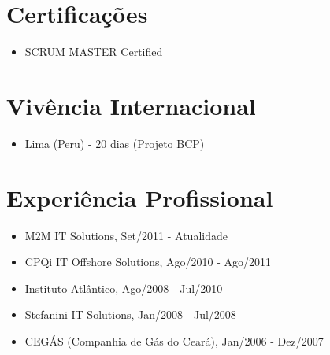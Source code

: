 \documentclass[letterpaper]{article}
\begin{document}
\section*{Certificações}
\begin{itemize}
  \item SCRUM MASTER Certified
\end{itemize}

\section*{Vivência Internacional}
\begin{itemize}
  \item Lima (Peru) - 20 dias (Projeto BCP)
\end{itemize}

\section*{Experiência Profissional}

\begin{itemize}
\item M2M IT Solutions, Set/2011 - Atualidade
\item CPQi IT Offshore Solutions, Ago/2010 - Ago/2011
\item Instituto Atlântico, Ago/2008 - Jul/2010
\item Stefanini IT Solutions, Jan/2008 - Jul/2008
\item CEGÁS (Companhia de Gás do Ceará), Jan/2006 - Dez/2007
\end{itemize}
\end{document}
